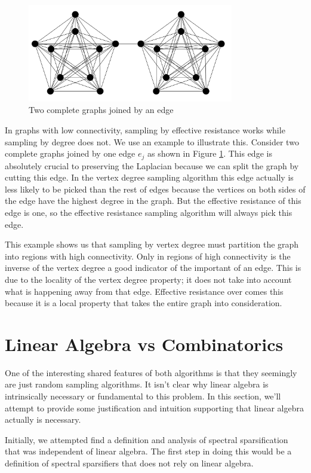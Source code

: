 \documentclass[12pt,twoside]{article}
\begin{document}
\begin{figure}[ht!]
\centering
\includegraphics[width=90mm]{complete-graphs.png}
\caption{Two complete graphs joined by an edge}
\label{complete-graphs}
\end{figure}


In graphs with low connectivity, sampling by effective resistance works while sampling by degree does not. We use an example to illustrate this. Consider two complete graphs joined by one edge $e_j$ as shown in Figure \ref{complete-graphs}. This edge is absolutely crucial to preserving the Laplacian because we can split the graph by cutting this edge. In the vertex degree sampling algorithm this edge actually is less likely to be picked than the rest of edges because the vertices on both sides of the edge have the highest degree in the graph. But the effective resistance of this edge is one, so the effective resistance sampling algorithm will always pick this edge. 

This example shows us that sampling by vertex degree must partition the graph into regions with high connectivity. Only in regions of high connectivity is the inverse of the vertex degree a good indicator of the important of an edge. This is due to the locality of the vertex degree property; it does not take into account what is happening away from that edge. Effective resistance over comes this because it is a local property that takes the entire graph into consideration. 

\section{Linear Algebra vs Combinatorics}
One of the interesting shared features of both algorithms is that they seemingly are just random sampling algorithms. It isn't clear why linear algebra is intrinsically necessary or fundamental to this problem. In this section, we'll attempt to provide some justification and intuition supporting that linear algebra actually is necessary. 

Initially, we attempted find a definition and analysis of spectral sparsification that was independent of linear algebra. The first step in doing this would be a definition of spectral sparsifiers that does not rely on linear algebra. 
\end{document}
